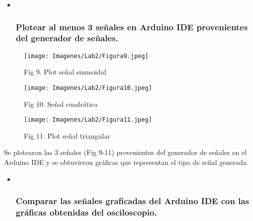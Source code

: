 \documentclass[
  letterpaper,
  DIV=11,
  numbers=noendperiod]{scrartcl}
\begin{document}
\begin{itemize}
\item ~
  \subsubsection{Plotear al menos 3 señales en Arduino IDE provenientes
  del generador de
  señales.}\label{plotear-al-menos-3-seuxf1ales-en-arduino-ide-provenientes-del-generador-de-seuxf1ales.}
\end{itemize}

\begin{figure}[H]

{\centering \texttt{[image: Imagenes/Lab2/Figura9.jpeg]}

}

\caption{Fig 9. Plot señal sinusoidal}

\end{figure}%
\begin{figure}[H]

{\centering \texttt{[image: Imagenes/Lab2/Figura10.jpeg]}

}

\caption{Fig 10. Señal cuadrática}

\end{figure}%
\begin{figure}[H]

{\centering \texttt{[image: Imagenes/Lab2/Figura11.jpeg]}

}

\caption{Fig 11. Plot señal triangular}

\end{figure}%

Se plotearon las 3 señales (Fig 9-11) provenientes del generador de
señales en el Arduino IDE y se obtuvieron gráficas que representan el
tipo de señal generada.

\begin{itemize}
\item ~
  \subsubsection{Comparar las señales graficadas del Arduino IDE con las
  gráficas obtenidas del
  osciloscopio.}\label{comparar-las-seuxf1ales-graficadas-del-arduino-ide-con-las-gruxe1ficas-obtenidas-del-osciloscopio.}
\end{itemize}
\end{document}

